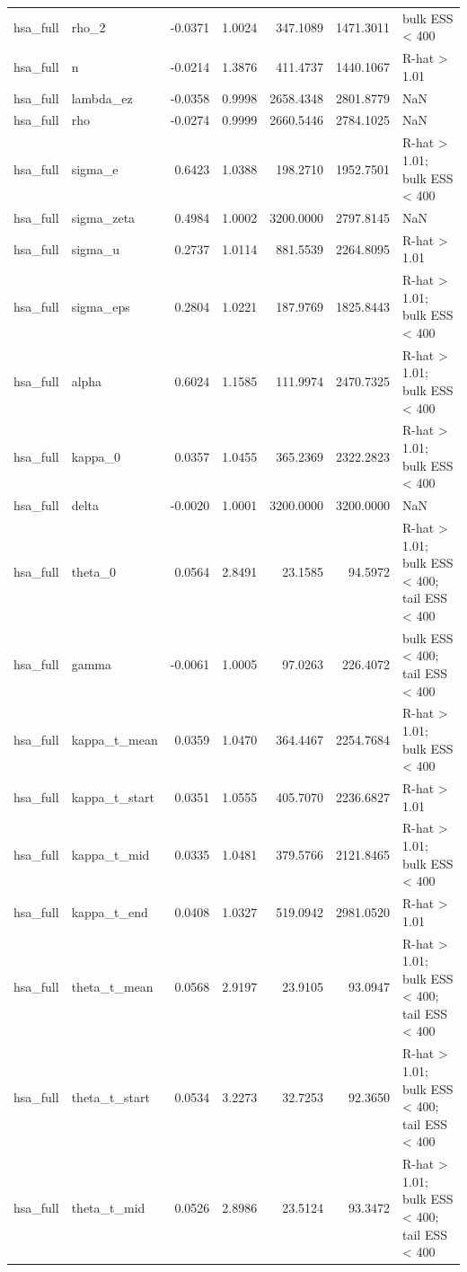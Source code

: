 \begin{tabular}{llrrrrl}
hsa\_full & rho\_2 & -0.0371 & 1.0024 & 347.1089 & 1471.3011 & bulk ESS < 400 \\
hsa\_full & n & -0.0214 & 1.3876 & 411.4737 & 1440.1067 & R-hat > 1.01 \\
hsa\_full & lambda\_ez & -0.0358 & 0.9998 & 2658.4348 & 2801.8779 & NaN \\
hsa\_full & rho & -0.0274 & 0.9999 & 2660.5446 & 2784.1025 & NaN \\
hsa\_full & sigma\_e & 0.6423 & 1.0388 & 198.2710 & 1952.7501 & R-hat > 1.01; bulk ESS < 400 \\
hsa\_full & sigma\_zeta & 0.4984 & 1.0002 & 3200.0000 & 2797.8145 & NaN \\
hsa\_full & sigma\_u & 0.2737 & 1.0114 & 881.5539 & 2264.8095 & R-hat > 1.01 \\
hsa\_full & sigma\_eps & 0.2804 & 1.0221 & 187.9769 & 1825.8443 & R-hat > 1.01; bulk ESS < 400 \\
hsa\_full & alpha & 0.6024 & 1.1585 & 111.9974 & 2470.7325 & R-hat > 1.01; bulk ESS < 400 \\
hsa\_full & kappa\_0 & 0.0357 & 1.0455 & 365.2369 & 2322.2823 & R-hat > 1.01; bulk ESS < 400 \\
hsa\_full & delta & -0.0020 & 1.0001 & 3200.0000 & 3200.0000 & NaN \\
hsa\_full & theta\_0 & 0.0564 & 2.8491 & 23.1585 & 94.5972 & R-hat > 1.01; bulk ESS < 400; tail ESS < 400 \\
hsa\_full & gamma & -0.0061 & 1.0005 & 97.0263 & 226.4072 & bulk ESS < 400; tail ESS < 400 \\
hsa\_full & kappa\_t\_mean & 0.0359 & 1.0470 & 364.4467 & 2254.7684 & R-hat > 1.01; bulk ESS < 400 \\
hsa\_full & kappa\_t\_start & 0.0351 & 1.0555 & 405.7070 & 2236.6827 & R-hat > 1.01 \\
hsa\_full & kappa\_t\_mid & 0.0335 & 1.0481 & 379.5766 & 2121.8465 & R-hat > 1.01; bulk ESS < 400 \\
hsa\_full & kappa\_t\_end & 0.0408 & 1.0327 & 519.0942 & 2981.0520 & R-hat > 1.01 \\
hsa\_full & theta\_t\_mean & 0.0568 & 2.9197 & 23.9105 & 93.0947 & R-hat > 1.01; bulk ESS < 400; tail ESS < 400 \\
hsa\_full & theta\_t\_start & 0.0534 & 3.2273 & 32.7253 & 92.3650 & R-hat > 1.01; bulk ESS < 400; tail ESS < 400 \\
hsa\_full & theta\_t\_mid & 0.0526 & 2.8986 & 23.5124 & 93.3472 & R-hat > 1.01; bulk ESS < 400; tail ESS < 400 \\

\end{tabular}

